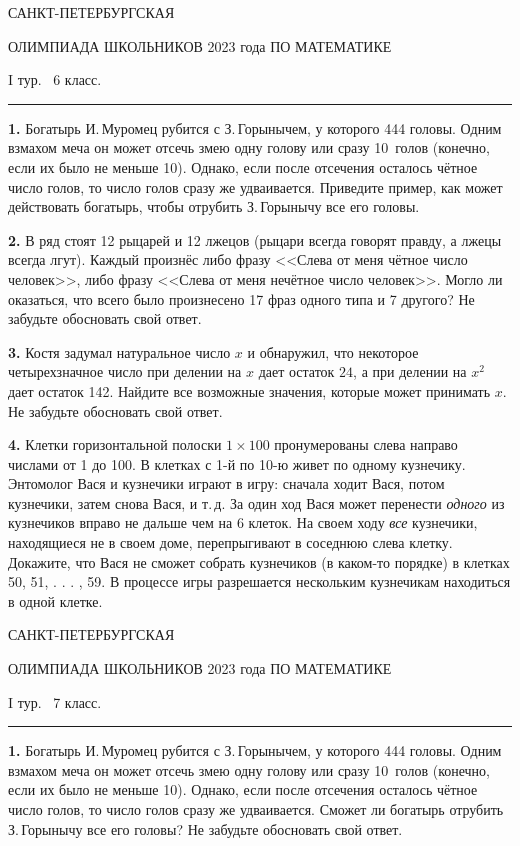 \documentclass[12pt]{article}
\def\q#1.{{\bf #1. }}
\begin{document}
\centerline{\sc САНКТ-ПЕТЕРБУРГСКАЯ}
\centerline{\sc ОЛИМПИАДА ШКОЛЬНИКОВ 2023 года ПО МАТЕМАТИКЕ}
\centerline{\sc I тур. \ 6 класс.}
\medskip
\hrule
\bigskip

\q1. Богатырь И.\,Муромец рубится с З.\,Горынычем, у которого 444 головы. Одним взмахом меча он может отсечь змею одну голову или сразу 10~голов (конечно, если их было не меньше 10).  Однако, если после отсечения осталось чётное число голов, то число голов сразу же удваивается. Приведите пример, как может действовать богатырь, чтобы отрубить З.\,Горынычу все его головы. 

\q2.  В ряд стоят 12 рыцарей и 12 лжецов (рыцари всегда говорят правду, а лжецы всегда лгут). Каждый произнёс либо фразу <<Слева от меня чётное число человек>>, либо фразу <<Слева от меня нечётное число человек>>. Могло ли оказаться, что всего было произнесено 17 фраз одного типа и 7 другого? Не забудьте обосновать свой ответ.

\q3. Костя задумал натуральное число $x$ и обнаружил, что некоторое четырехзначное число при делении на $x$ дает остаток $24$, а при делении на $x^2$ дает остаток 142. Найдите все возможные значения, которые может принимать $x$. Не забудьте обосновать свой ответ.

\q4. Клетки горизонтальной полоски $1\times 100$ пронумерованы слева направо числами от 1 до 100. В клетках с 1-й по 10-ю живет по одному кузнечику. Энтомолог Вася и кузнечики играют в игру: сначала ходит Вася, потом кузнечики, затем снова Вася, и т.\,д. За один ход Вася может перенести \emph{одного} из кузнечиков вправо не дальше чем на 6 клеток. На своем ходу \emph{все} кузнечики, находящиеся не в своем доме, перепрыгивают в соседнюю слева клетку. Докажите, что Вася не сможет собрать кузнечиков (в каком-то порядке) в клетках 50, 51, . . . , 59. В процессе игры разрешается нескольким кузнечикам находиться в одной клетке.


\clearpage

\centerline{\sc САНКТ-ПЕТЕРБУРГСКАЯ}
\centerline{\sc ОЛИМПИАДА ШКОЛЬНИКОВ 2023 года ПО МАТЕМАТИКЕ}
\centerline{\sc I тур. \ 7 класс.}
\medskip
\hrule
\bigskip

\q1. Богатырь И.\,Муромец рубится с З.\,Горынычем, у которого 444 головы. Одним взмахом меча он может отсечь змею одну голову или сразу 10~голов (конечно, если их было не меньше 10). Однако, если после отсечения осталось чётное число голов, то число голов сразу же удваивается. Сможет ли богатырь отрубить З.\,Горынычу все его головы?  Не забудьте обосновать свой ответ.
\end{document}
